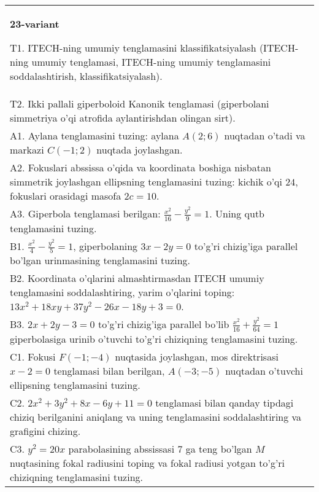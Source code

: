 \documentclass{article}
\begin{document}
\begin{tabular}{m{17cm}}
\textbf{23-variant}
\newline

T1. ITECH-ning umumiy tenglamasini klassifikatsiyalash (ITECH-ning umumiy tenglamasi, ITECH-ning umumiy tenglamasini soddalashtirish, klassifikatsiyalash).\\

T2. Ikki pallali giperboloid Kanonik tenglamasi (giperbolani simmetriya o'qi atrofida aylantirishdan olingan sirt).\\

A1. Aylana tenglamasini tuzing: aylana $A(2;6)$ nuqtadan o'tadi va markazi $C(-1;2)$ nuqtada joylashgan.\\

A2. Fokuslari abssissa o'qida va koordinata boshiga nisbatan simmetrik joylashgan ellipsning tenglamasini tuzing: kichik o'qi $24$, fokuslari orasidagi masofa $2c=10$.\\

A3. Giperbola tenglamasi berilgan: $\frac{x^{2}}{16}-\frac{y^{2}}{9}=1$. Uning qutb tenglamasini tuzing.\\

B1. $\frac{x^{2}}{4} - \frac{y^{2}}{5} = 1$, giperbolaning $3x - 2y = 0$ to'g'ri chizig'iga parallel bo'lgan urinmasining tenglamasini tuzing.  \\

B2. Koordinata o'qlarini almashtirmasdan ITECH umumiy tenglamasini soddalashtiring, yarim o'qlarini toping: $13x^{2} + 18xy + 37y^{2} - 26x - 18y + 3 = 0$.  \\

B3. $2x + 2y - 3 = 0$ to'g'ri chizig'iga parallel bo'lib $\frac{x^{2}}{16} + \frac{y^{2}}{64} = 1$ giperbolasiga urinib o'tuvchi to'g'ri chiziqning tenglamasini tuzing.  \\

C1. Fokusi $F( - 1; - 4)$ nuqtasida joylashgan, mos direktrisasi $x - 2 = 0$ tenglamasi bilan berilgan, $A( - 3; - 5)$ nuqtadan o'tuvchi ellipsning tenglamasini tuzing.  \\

C2. $2x^{2} + 3y^{2} + 8x - 6y + 11 = 0$ tenglamasi bilan qanday tipdagi chiziq berilganini aniqlang va uning tenglamasini soddalashtiring va grafigini chizing.  \\

C3. $y^{2} = 20x$ parabolasining abssissasi 7 ga teng bo'lgan $M$ nuqtasining fokal radiusini toping va fokal radiusi yotgan to'g'ri chiziqning tenglamasini tuzing.  \\

\end{tabular}
\vspace{1cm}
\end{document}
